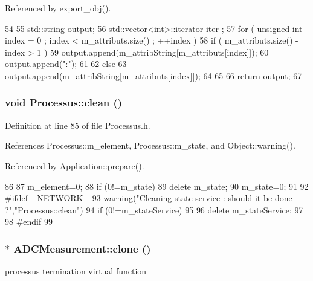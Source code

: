 Referenced by export\_\-obj().


\begin{DoxyCode}
54                             {
55   std::string output;
56   std::vector<int>::iterator iter ;
57   for ( unsigned int index = 0 ; index < m_attributs.size() ; ++index ) {
58     if ( m_attributs.size() - index > 1 ) {
59       output.append(m_attribString[m_attributs[index]]);
60       output.append(":");
61     }
62     else {
63       output.append(m_attribString[m_attributs[index]]);
64     }
65   }
66   return output;
67 }
\end{DoxyCode}
\hypertarget{classProcessus_aaeb17673b98d2b39f3aa780e335e0968}{
\subsubsection[{clean}]{\setlength{\rightskip}{0pt plus 5cm}void Processus::clean ()}}
\label{classProcessus_aaeb17673b98d2b39f3aa780e335e0968}


Definition at line 85 of file Processus.h.

References Processus::m\_\-element, Processus::m\_\-state, and Object::warning().

Referenced by Application::prepare().


\begin{DoxyCode}
86   {
87     m_element=0;
88     if (0!=m_state) {
89       delete m_state;
90       m_state=0;
91     }
92 #ifdef _NETWORK_
93     warning("Cleaning state service : should it be done ?","Processus::clean")
94       if (0!=m_stateService)
95       {
96         delete m_stateService;
97       }
98 #endif
99   }
\end{DoxyCode}
\hypertarget{classADCMeasurement_a6e34c2b4e3451f1fd128d213723ab1b9}{
\subsubsection[{clone}]{$\ast$ ADCMeasurement::clone ()}}
\label{classADCMeasurement_a6e34c2b4e3451f1fd128d213723ab1b9}
processus termination virtual function 


